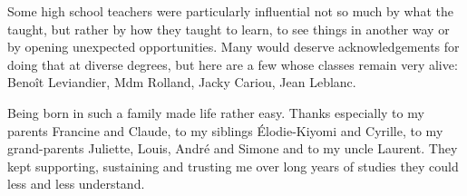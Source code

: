 Some high school teachers were particularly influential not so much by what the taught, but rather by how they taught to learn, to see things in another way or by opening unexpected opportunities. Many would deserve acknowledgements for doing that at diverse degrees, but here are a few whose classes remain very alive: Beno\^{i}t Leviandier, Mdm Rolland, Jacky Cariou, Jean Leblanc.

Being born in such a family made life rather easy. Thanks especially to my parents Francine and Claude, to my siblings \'{E}lodie-Kiyomi and Cyrille, to my grand-parents Juliette, Louis, Andr\'{e} and Simone and to my uncle Laurent. They kept supporting, sustaining and trusting me over long years of studies they could less and less understand.